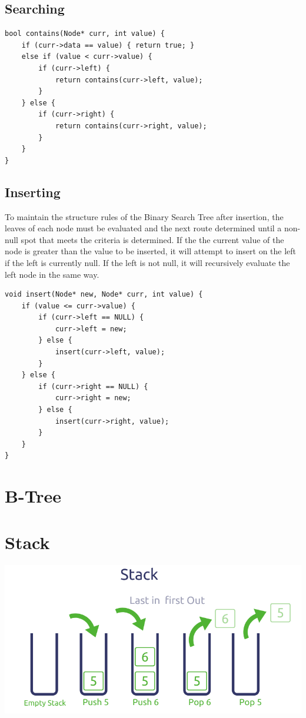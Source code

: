 \documentclass[11pt]{article}
\begin{document}
\subsection{Searching}

\begin{lstlisting}
bool contains(Node* curr, int value) {
    if (curr->data == value) { return true; }
    else if (value < curr->value) {
        if (curr->left) {
            return contains(curr->left, value);
        }
    } else {
        if (curr->right) {
            return contains(curr->right, value);
        }
    }
}
\end{lstlisting}

\subsection{Inserting}

To maintain the structure rules of the Binary Search Tree after insertion, the leaves of each node must be evaluated and the next route determined until a non-null spot that meets the criteria is determined. If the the current value of the node is greater than the value to be inserted, it will attempt to insert on the left if the left is currently null. If the left is not null, it will recursively evaluate the left node in the same way.

\begin{lstlisting}
void insert(Node* new, Node* curr, int value) {
    if (value <= curr->value) {
        if (curr->left == NULL) {
            curr->left = new;
        } else {
            insert(curr->left, value);
        }
    } else {
        if (curr->right == NULL) {
            curr->right = new;
        } else {
            insert(curr->right, value);
        }
    }
}
\end{lstlisting}

\section{B-Tree}

\section{Stack}
\begin{center}
    \includegraphics[width=250 px]{img/stack}  \\
\end{center}
\end{document}
